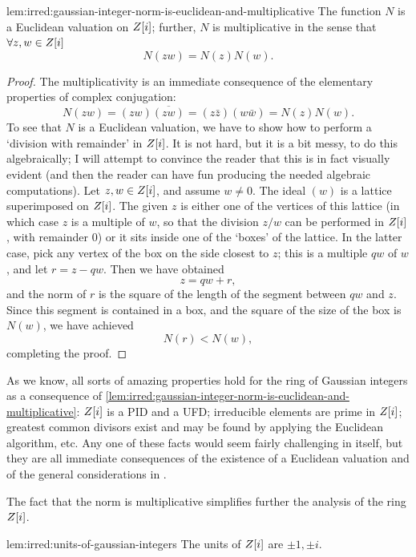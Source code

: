 \begin{lem}{}{lem:irred:gaussian-integer-norm-is-euclidean-and-multiplicative}
  The function $N$ is a Euclidean valuation on $Z[i]$; further, $N$
  is multiplicative in the sense that $\forall z, w \in Z[i]$
  \[N(zw) = N(z)N(w).\]
\end{lem}
\begin{proof}
  The multiplicativity is an immediate consequence of the elementary
  properties of complex conjugation:
  \[N(zw) = (zw)\overline{(zw)} = (z\bar{z})(w\bar{w}) = N(z)N(w).\]
  To see that $N$ is a Euclidean valuation, we have to show how to
  perform a `division with remainder' in $Z[i]$. It is not hard, but
  it is a bit messy, to do this algebraically; I will attempt to
  convince the reader that this is in fact visually evident (and then
  the reader can have fun producing the needed algebraic
  computations).  Let $z, w \in Z[i]$, and assume $w \neq 0$. The
  ideal $(w)$ is a lattice superimposed on $Z[i]$. The given $z$ is
  either one of the vertices of this lattice (in which case $z$ is a
  multiple of $w$, so that the division $z/w$ can be performed in
  $Z[i]$, with remainder $0$) or it sits inside one of the `boxes' of
  the lattice. In the latter case, pick any vertex of the box on the
  side closest to $z$; this is a multiple $qw$ of $w$, and let
  $r = z - qw$. Then we
  have obtained
  \[z = qw + r,\] and the norm of $r$ is the square of the length of
  the segment between $qw$ and $z$. Since this segment is contained in
  a box, and the square of the size of the box is $N(w)$, we have
  achieved
  \[N(r) < N(w),\] completing the proof.
\end{proof}
As we know, all sorts of amazing properties hold for the ring of
Gaussian integers as a consequence of \cref{lem:irred:gaussian-integer-norm-is-euclidean-and-multiplicative}: $Z[i]$ is
a PID and a UFD; irreducible elements are prime in $Z[i]$; greatest
common divisors exist and may be found by applying the Euclidean
algorithm, etc. Any one of these facts would seem fairly challenging
in itself, but they are all immediate consequences of the existence of
a Euclidean valuation and of the general considerations in
.

The fact that the norm is multiplicative simplifies further the
analysis of the ring $Z[i]$.
\begin{lem}{}{lem:irred:units-of-gaussian-integers}
  The units of $Z[i]$ are $\pm 1, \pm i$.
\end{lem}

